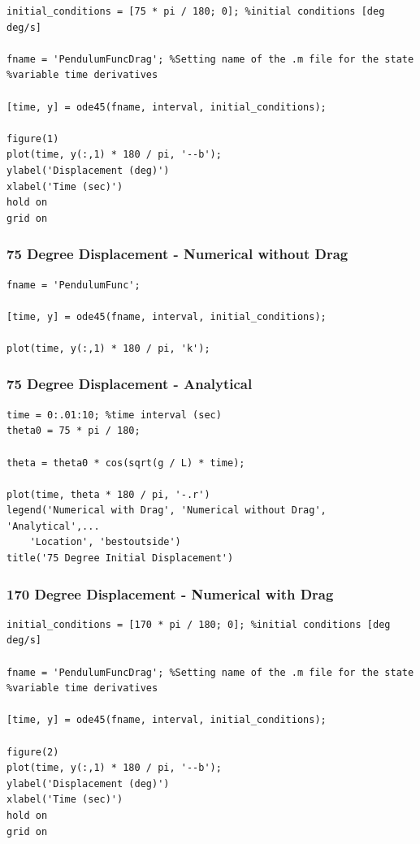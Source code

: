 \documentclass{article}
\begin{document}
\begin{verbatim}
initial_conditions = [75 * pi / 180; 0]; %initial conditions [deg deg/s]

fname = 'PendulumFuncDrag'; %Setting name of the .m file for the state
%variable time derivatives

[time, y] = ode45(fname, interval, initial_conditions);

figure(1)
plot(time, y(:,1) * 180 / pi, '--b');
ylabel('Displacement (deg)')
xlabel('Time (sec)')
hold on
grid on
\end{verbatim}



\subsubsection{75 Degree Displacement - Numerical without Drag}
\label{75nodrag}

\begin{verbatim}
fname = 'PendulumFunc';

[time, y] = ode45(fname, interval, initial_conditions);

plot(time, y(:,1) * 180 / pi, 'k');
\end{verbatim}



\subsubsection{75 Degree Displacement - Analytical}

\begin{verbatim}
time = 0:.01:10; %time interval (sec)
theta0 = 75 * pi / 180;

theta = theta0 * cos(sqrt(g / L) * time);

plot(time, theta * 180 / pi, '-.r')
legend('Numerical with Drag', 'Numerical without Drag', 'Analytical',...
    'Location', 'bestoutside')
title('75 Degree Initial Displacement')
\end{verbatim}

\subsubsection{170 Degree Displacement - Numerical with Drag}
\label{170drag}

\begin{verbatim}
initial_conditions = [170 * pi / 180; 0]; %initial conditions [deg deg/s]

fname = 'PendulumFuncDrag'; %Setting name of the .m file for the state
%variable time derivatives

[time, y] = ode45(fname, interval, initial_conditions);

figure(2)
plot(time, y(:,1) * 180 / pi, '--b');
ylabel('Displacement (deg)')
xlabel('Time (sec)')
hold on
grid on
\end{verbatim}
\end{document}
